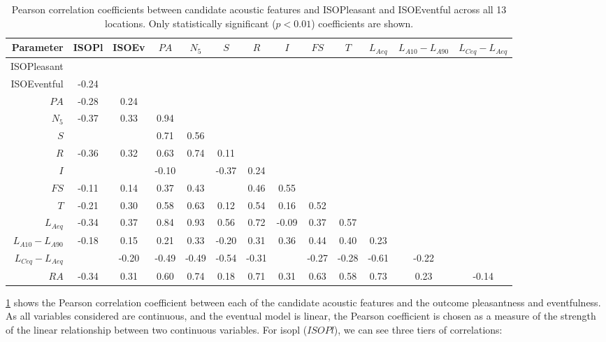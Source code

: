 \begin{table}
\centering
\caption{Pearson correlation coefficients between candidate acoustic features and ISOPleasant and ISOEventful across all 13 locations. Only statistically significant ($p < 0.01$) coefficients are shown. \label{tab:corr}}
\begin{tabular}{r|cccccccccccc} 
\toprule
\textbf{Parameter} & ISOPl & ISOEv & $PA$ & $N_5$ & $S$ & $R$ & $I$ & $FS$ & $T$ & $L_{Aeq}$ & $L_{A10}-L_{A90}$ & $L_{Ceq}-L_{Aeq}$ \\ 
\midrule
ISOPleasant &  &  &  &  &  &  &  &  &  &  &  &  \\
ISOEventful & -0.24 &  &  &  &  &  &  &  &  &  &  &  \\
$PA$ & -0.28 & 0.24 &  &  &  &  &  &  &  &  &  &  \\
$N_5$ & -0.37 & 0.33 & 0.94 &  &  &  &  &  &  &  &  &  \\
$S$ &  &  & 0.71 & 0.56 &  &  &  &  &  &  &  &  \\
$R$ & -0.36 & 0.32 & 0.63 & 0.74 & 0.11 &  &  &  &  &  &  &  \\
$I$ &  &  & -0.10 &  & -0.37 & 0.24 &  &  &  &  &  &  \\
$FS$ & -0.11 & 0.14 & 0.37 & 0.43 &  & 0.46 & 0.55 &  &  &  &  &  \\
$T$ & -0.21 & 0.30 & 0.58 & 0.63 & 0.12 & 0.54 & 0.16 & 0.52 &  &  &  &  \\
$L_{Aeq}$ & -0.34 & 0.37 & 0.84 & 0.93 & 0.56 & 0.72 & -0.09 & 0.37 & 0.57 &  &  &  \\
$L_{A10}-L_{A90}$ & -0.18 & 0.15 & 0.21 & 0.33 & -0.20 & 0.31 & 0.36 & 0.44 & 0.40 & 0.23 &  &  \\
$L_{Ceq}-L_{Aeq}$ &  & -0.20 & -0.49 & -0.49 & -0.54 & -0.31 &  & -0.27 & -0.28 & -0.61 & -0.22 &  \\
$RA$ & -0.34 & 0.31 & 0.60 & 0.74 & 0.18 & 0.71 & 0.31 & 0.63 & 0.58 & 0.73 & 0.23 & -0.14 \\
\bottomrule
\end{tabular}
\end{table}

   \cref{tab:corr} shows the Pearson correlation coefficient between each of the candidate acoustic features and the outcome pleasantness and eventfulness. As all variables considered are continuous, and the eventual model is linear, the Pearson coefficient is chosen as a measure of the strength of the linear relationship between two continuous variables. For \gls{isopl} ($ISOPl$), we can see three tiers of correlations:

